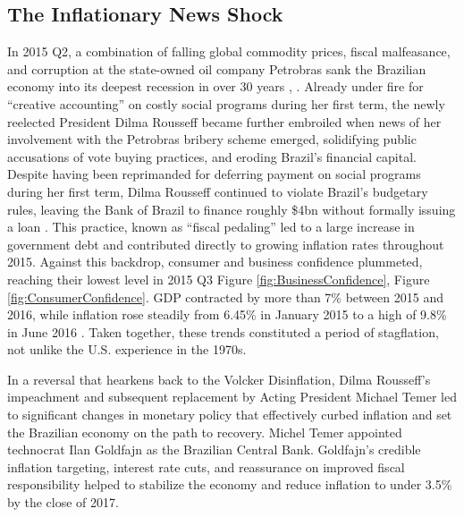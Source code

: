 \documentclass[12pt]{article}
\begin{document}
		\subsection{The Inflationary News Shock}
			 In 2015 Q2, a combination of falling global commodity prices, fiscal malfeasance, and corruption at the state-owned oil company Petrobras sank the Brazilian economy into its deepest recession in over 30 years \cite{yukBrazilSlumpsWorst2016}, \cite{dyerBrazilEconomySlips2015}. Already under fire for ``creative accounting'' on costly social programs during her first term, the newly reelected President Dilma Rousseff became further embroiled when news of her involvement with the Petrobras bribery scheme emerged, solidifying public accusations of vote buying practices, and eroding Brazil's financial capital. Despite having been reprimanded for deferring payment on social programs during her first term,  Dilma Rousseff continued to violate Brazil's budgetary rules, leaving the Bank of Brazil to finance roughly \$4bn without formally issuing a loan \cite{phillipsChargesBrazilianPresident2016}. This practice, known as ``fiscal pedaling'' led to a large increase in government debt and contributed directly to growing inflation rates throughout 2015. Against this backdrop, consumer and business confidence plummeted, reaching their lowest level in 2015 Q3 Figure \ref{fig:BusinessConfidence}, Figure \ref{fig:ConsumerConfidence}. GDP contracted by more than 7\% between 2015 and 2016, while inflation rose steadily from 6.45\% in January 2015 to a high of 9.8\% in June 2016 \cite{leahyCoolHeadCrisis2017}. Taken together, these trends constituted a period of stagflation, not unlike the U.S. experience in the 1970s.

			In a reversal that hearkens back to the Volcker Disinflation, Dilma Rousseff's impeachment and subsequent replacement by Acting President Michael Temer led to significant changes in monetary policy that effectively curbed inflation and set the Brazilian economy on the path to recovery. Michel Temer appointed technocrat Ilan Goldfajn as the Brazilian Central Bank. Goldfajn's credible inflation targeting, interest rate cuts, and reassurance on improved fiscal responsibility helped to stabilize the economy and reduce inflation to under 3.5\% by the close of 2017.
\end{document}
